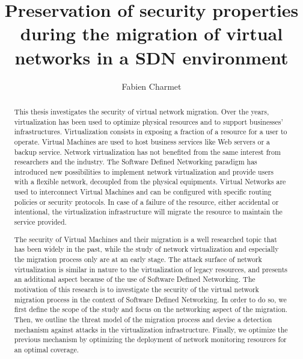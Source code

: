 \documentclass[a4paper, 11pt]{report}
\title{\LARGE \bf Preservation of security properties during the migration of virtual networks in a SDN environment}
\author{Fabien Charmet}
\theoremstyle{definition}
\begin{document}

\maketitle

\begin{abstract}
This thesis investigates the security of virtual network migration. Over the years, virtualization has been used to optimize physical resources and to support businesses' infrastructures. Virtualization consists in exposing a fraction of a resource for a user to operate. Virtual Machines are used to host business services like Web servers or a backup service. Network virtualization has not benefited from the same interest from researchers and the industry. The Software Defined Networking paradigm has introduced new possibilities to implement network virtualization and provide users with a flexible network, decoupled from the physical equipments. Virtual Networks are used to interconnect Virtual Machines and can be configured with specific routing policies or security protocols. In case of a failure of the resource, either accidental or intentional, the virtualization infrastructure will migrate the resource to maintain the service provided.

The security of Virtual Machines and their migration is a well researched topic that has been widely in the past, while the study of network virtualization and especially the migration process only are at an early stage. The attack surface of network virtualization is similar in nature to the virtualization of legacy resources, and presents an additional aspect because of the use of Software Defined Networking.
The motivation of this research is to investigate the security of the virtual network migration process in the context of Software Defined Networking. In order to do so, we first define the scope of the study and focus on the networking aspect of the migration. Then, we outline the threat model of the migration process and devise a detection mechanism against attacks in the virtualization infrastructure. Finally, we optimize the previous mechanism by optimizing the deployment of network monitoring resources for an optimal coverage.


\end{abstract}
\end{document}
